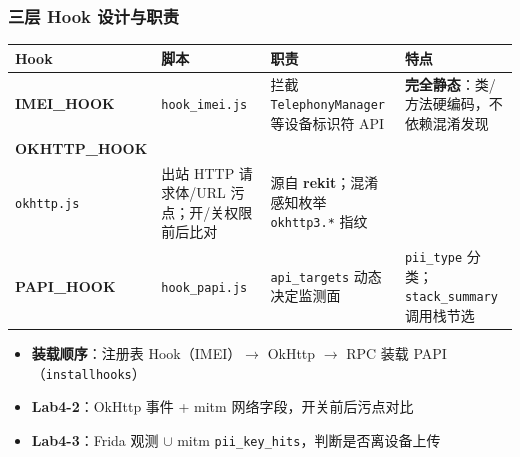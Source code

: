 \documentclass[AutoFakeBold,AutoFakeSlant]{beamer}
\newcommand{\arrown}{\ensuremath{\rightarrow}}
\begin{document}
\begin{frame}
    \frametitle{三层 Hook 设计与职责}
    \footnotesize
    \setlength{\tabcolsep}{3.5pt}
    \renewcommand{\arraystretch}{1.12}
    \begin{tabularx}{\linewidth}{|l|>{\raggedright\arraybackslash}p{1.9cm}|>{\raggedright\arraybackslash}X|>{\raggedright\arraybackslash}X|}
        \hline
        \textbf{Hook} & \textbf{脚本} & \textbf{职责} & \textbf{特点} \\
        \hline
        \textbf{IMEI\_HOOK} & \texttt{hook\_imei.js} &
        拦截 \texttt{TelephonyManager} 等设备标识符 API &
        \textbf{完全静态}：类/方法硬编码，不依赖混淆发现 \\
        \hline
        \textbf{OKHTTP\_HOOK} &
        \makecell[l]{\texttt{hook\_network\_}\\\texttt{okhttp.js}} &
        出站 HTTP 请求体/URL 污点；开/关权限前后比对 &
        源自 \textbf{rekit}；混淆感知枚举 \texttt{okhttp3.*} 指纹 \\
        \hline
        \textbf{PAPI\_HOOK} & \texttt{hook\_papi.js} &
        \texttt{api\_targets} 动态决定监测面 &
        \texttt{pii\_type} 分类；\texttt{stack\_summary} 调用栈节选 \\
        \hline
    \end{tabularx}
    \vspace{0.25em}
    \begin{itemize}\setlength{\itemsep}{0.12em}
        \item \textbf{装载顺序}：注册表 Hook（IMEI）\arrown{} OkHttp \arrown{} RPC 装载 PAPI（\texttt{installhooks}）
        \item \textbf{Lab4-2}：OkHttp 事件 + mitm 网络字段，开关前后污点对比
        \item \textbf{Lab4-3}：Frida 观测 $\cup$ mitm \texttt{pii\_key\_hits}，判断是否离设备上传
    \end{itemize}
\end{frame}
\end{document}

